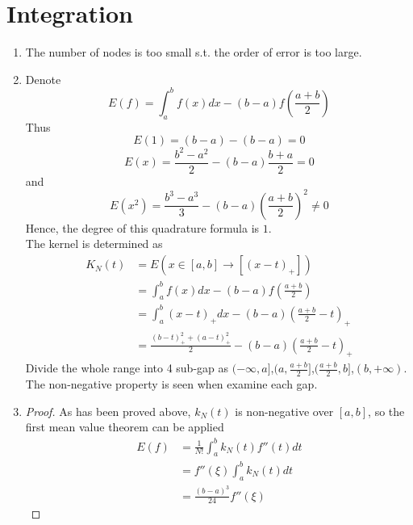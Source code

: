 \documentclass[paper=a4, fontsize=11pt]{scrartcl} %
\numberwithin{equation}{section} %
\numberwithin{figure}{section} %
\numberwithin{table}{section} %
\begin{document}
\section{Integration}
\begin{enumerate}
	\item 
		The number of nodes is too small s.t. the order of error is too large.
	\item 
		Denote
		\begin{equation}
			E(f) = \int_{a}^{b} f(x)dx - (b-a)f(\frac{a+b}{2})
		\end{equation}
		Thus
		\begin{equation}
			E(1) = (b-a) - (b-a) = 0
		\end{equation}
		\begin{equation}
			E(x) = \frac{b^2-a^2}{2} - (b-a)\frac{b+a}{2} = 0
		\end{equation}
		and
		\begin{equation}
			E(x^2) = \frac{b^3-a^3}{3} - (b-a)(\frac{a+b}{2})^2 \neq 0
		\end{equation}
		Hence, the degree of this quadrature formula is $1$.\\
		The kernel is determined as
		\begin{equation}
			\begin{aligned}
				K_N(t) & = E(x\in [a, b] \rightarrow [(x-t)_+])\\
					   & = \int_{a}^{b} f(x)dx - (b-a)f(\frac{a+b}{2})\\
					   & = \int_{a}^{b} (x-t)_+dx - (b-a)(\frac{a+b}{2}-t)_+\\
					   & = \frac{(b-t)_+^2 + (a-t)_+^2}{2} - (b-a)(\frac{a+b}{2}-t)_+
			\end{aligned}
		\end{equation} 
		Divide the whole range into 4 sub-gap as $(-\infty, a]$,$(a, \frac{a+b}{2}]$,$(\frac{a+b}{2}, b]$,$(b, +\infty)$.
		The non-negative property is seen when examine each gap.
	\item 
		\begin{proof}
			As has been proved above, $k_N(t)$ is non-negative over $[a, b]$, so the first mean value theorem can be applied
			\begin{equation}
				\begin{aligned}
					E(f) & = \frac{1}{N!} \int_{a}^{b}k_N(t)f''(t)dt\\
					     & = f''(\xi) \int_{a}^{b}k_N(t)dt\\
					     & = \frac{(b-a)^3}{24} f''(\xi)
				\end{aligned}
			\end{equation}
		\end{proof}
\end{enumerate}
\end{document}
